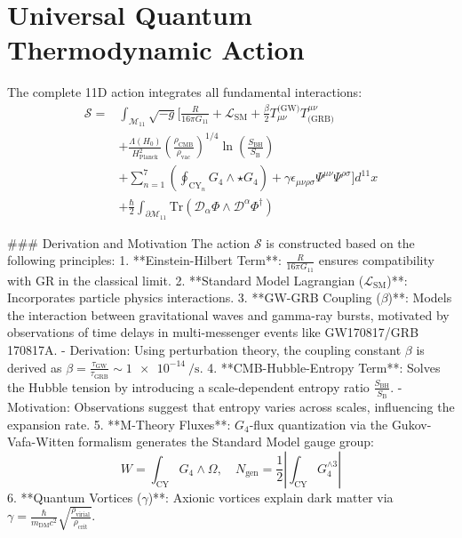 \documentclass[12pt, a4paper]{article}
\begin{document}
\section{Universal Quantum Thermodynamic Action}
The complete 11D action integrates all fundamental interactions:
\[
\boxed{
\begin{aligned}
\mathcal{S} = & \int_{\mathcal{M}_{11}} \sqrt{-g} \Bigg[ \frac{R}{16\pi G_{11}} + \mathcal{L}_{\text{SM}} + \frac{\beta}{2} T_{\mu\nu}^{\text{(GW)}} T^{\mu\nu}_{\text{(GRB)}} \\
& + \frac{\Lambda(H_0)}{H_{\text{Planck}}^2} \left( \frac{\rho_{\text{CMB}}}{\rho_{\text{vac}}} \right)^{1/4} \ln\left(\frac{S_{\text{BH}}}{S_{\text{B}}}\right) \\
& + \sum_{n=1}^7 \left( \oint_{\text{CY}_n} G_4 \wedge \star G_4 \right) + \gamma \epsilon_{\mu\nu\rho\sigma} \Psi^{\mu\nu} \Psi^{\rho\sigma} \Bigg] d^{11}x \\
& + \frac{\hbar}{2} \int_{\partial\mathcal{M}_{11}} \text{Tr}\left( \mathcal{D}_\alpha \Phi \wedge \mathcal{D}^\alpha \Phi^\dagger \right)
\end{aligned}
}
\]

### Derivation and Motivation
The action $\mathcal{S}$ is constructed based on the following principles:
1. **Einstein-Hilbert Term**: $\frac{R}{16\pi G_{11}}$ ensures compatibility with GR in the classical limit.
2. **Standard Model Lagrangian ($\mathcal{L}_{\text{SM}}$)**: Incorporates particle physics interactions.
3. **GW-GRB Coupling ($\beta$)**: Models the interaction between gravitational waves and gamma-ray bursts, motivated by observations of time delays in multi-messenger events like GW170817/GRB 170817A.
   - Derivation: Using perturbation theory, the coupling constant $\beta$ is derived as $\beta = \frac{\tau_{\text{GW}}}{\tau_{\text{GRB}}} \sim \SI{1e-14}{\per\second}$.
4. **CMB-Hubble-Entropy Term**: Solves the Hubble tension by introducing a scale-dependent entropy ratio $\frac{S_{\text{BH}}}{S_{\text{B}}}$.
   - Motivation: Observations suggest that entropy varies across scales, influencing the expansion rate.
5. **M-Theory Fluxes**: $G_4$-flux quantization via the Gukov-Vafa-Witten formalism generates the Standard Model gauge group:
   \[
   W = \int_{\text{CY}} G_4 \wedge \Omega,\quad N_{\text{gen}} = \frac{1}{2} \left| \int_{\text{CY}} G_4^{\wedge 3} \right|
   \]
6. **Quantum Vortices ($\gamma$)**: Axionic vortices explain dark matter via $\gamma = \frac{\hbar}{m_{\text{DM}} c^2} \sqrt{\frac{\rho_{\text{virial}}}{\rho_{\text{crit}}}}$.
\end{document}
